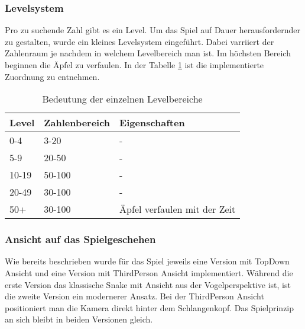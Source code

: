 \subsubsection{Levelsystem}
Pro zu suchende Zahl gibt es ein Level. Um das Spiel auf Dauer herausfordernder zu gestalten, wurde ein kleines Levelsystem eingeführt. Dabei varriiert der Zahlenraum je nachdem in welchem Levelbereich man ist. Im höchsten Bereich beginnen die Äpfel zu verfaulen. In der Tabelle \ref{tab:levels} ist die implementierte Zuordnung zu entnehmen.
\begin{table}[h!]
\centering
\begin{tabular}{|l|l|l|}
\hline
\textbf{Level} & \textbf{Zahlenbereich} & \textbf{Eigenschaften}       \\ \hline
0-4            & 3-20                   & -                            \\ \hline
5-9            & 20-50                  & -                            \\ \hline
10-19          & 50-100                 & -                            \\ \hline
20-49          & 30-100                 & -                            \\ \hline
50+            & 30-100                 & Äpfel verfaulen mit der Zeit \\ \hline
\end{tabular}
\caption{Bedeutung der einzelnen Levelbereiche\label{tab:levels}}
\end{table}
\subsubsection{Ansicht auf das Spielgeschehen}
Wie bereits beschrieben wurde für das Spiel jeweils eine Version mit TopDown Ansicht und eine Version mit ThirdPerson Ansicht implementiert. Während die erste Version das klassische Snake mit Ansicht aus der Vogelperspektive ist, ist die zweite Version ein modernerer Ansatz. Bei der ThirdPerson Ansicht positioniert man die Kamera direkt hinter dem Schlangenkopf. Das Spielprinzip an sich bleibt in beiden Versionen gleich.


